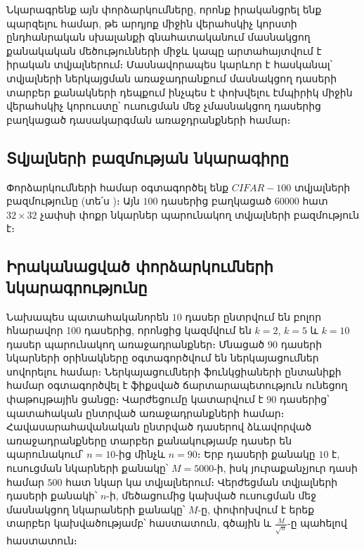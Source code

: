 \documentclass[12pt]{article}
\begin{document}
Նկարագրենք այն փորձարկումները, որոնք իրականցրել ենք պարզելու համար, թե արդյոք միջին վերահսկիչ կորստի ընդհանրական  սխալանքի գնահատականում մասնակցող քանակական մեծությունների միջև կապը  արտահայտվում է  իրական տվյալներում։ Մասնավորապես կարևոր է հասկանալ՝ տվյալների ներկայցման առաջադրանքում մասնակցող դասերի տարբեր քանակների  դեպքում ինչպես է փոխվելու էմպիրիկ միջին վերահսկիչ կորուստը՝ ուսուցման մեջ չմասնակցող դասերից բաղկացած դասակարգման առաջդրանքների համար։
{}


\subsection*{\hfill Տվյալների բազմության նկարագիրը \hfill} \noindent
\par Փորձարկումների համար օգտագործել ենք $CIFAR-100$ տվյալների բազմությունը (տե՛ս \cite{bib_item_14})։ Այն $100$ դասերից բաղկացած $60000$ հատ $32\times 32$ չափսի փոքր նկարներ պարունակող տվյալների բազմություն է։
{}


\subsection*{\hfill Իրականացված փորձարկումների նկարագրությունը \hfill} \noindent



\par Նախապես պատահականորեն $10$ դասեր ընտրվում են բոլոր հնարավոր 100 դասերից, որոնցից կազմվում են $k=2$, $k=5$ և $k=10$ դասեր պարունակող առաջադրանքներ։ Մնացած $90$ դասերի նկարների օրինակները օգտագործվում են ներկայացումներ սովորելու համար։ Ներկայացումների ֆունկցիաների ընտանիքի համար օգտագործվել  է ֆիքսված ճարտարապետություն ունեցող փաթույթային ցանցը։ Վարժեցումը կատարվում է $90$ դասերից՝ պատահական ընտրված առաջադրանքների համար։ Հավասարահավանական ընտրված դասերով ձևավորված առաջադրանքները տարբեր քանակությամբ դասեր են պարունակում՝ $n=10$-ից մինչև $n=90$։ Երբ դասերի քանակը $10$ է, ուսուցման նկարների քանակը՝ $M=5000$-ի, իսկ յուրաքանչյուր դասի համար $500$ հատ նկար կա տվյալներում։ Վերժեցման տվյալների դասերի քանակի՝ $n$-ի,  մեծացումից կախված ուսուցման մեջ մասնակցող նկարաների քանակը՝ $M$-ը, փոփոխվում է երեք տարբեր կախվածությամբ՝ հաստատուն, գծային և $\frac{M}{\sqrt{n}}$-ը պահելով հաստատուն։
\end{document}
